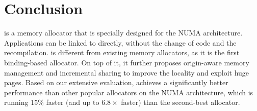 \section{Conclusion}
\label{sec:conclusion}

\NM{} is a memory allocator that is specially designed for the NUMA architecture. Applications can be linked to \NM{} directly, without the change of code and the recompilation. \NM{} is different from existing memory allocators, as it is the first binding-based allocator. 
On top of it, it further proposes origin-aware memory management and incremental sharing to improve the locality and exploit huge pages. 
Based on our extensive evaluation, \NM{} achieves a significantly better performance than other popular allocators on the NUMA architecture, which is running 15\% faster (and up to $6.8\times$ faster) than the second-best allocator.
